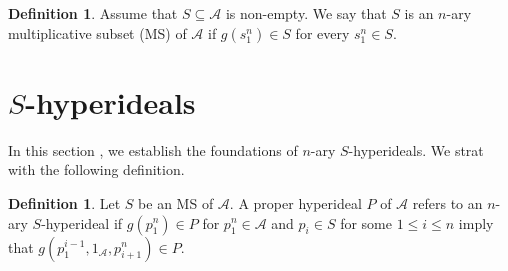 \documentclass[preprint,review,10pt]{amsart}
\theoremstyle{definition}
\newtheorem{definition}[theorem]{Definition}
\theoremstyle{remark}
\numberwithin{equation}{section}
\begin{document}
\begin{definition} \cite{sorc1}
Assume that $S \subseteq \mathscr{A}$ is  non-empty. We say that $S$ is  an  $n$-ary multiplicative subset (MS) of $\mathscr{A}$  if $g(s_1^n) \in S$ for every $s_1^n \in S$.
\end{definition}

\section{$S$-hyperideals}
In this section , we establish the foundations of $n$-ary $S$-hyperideals. We strat with the following definition.
\begin{definition}
Let $S$ be an MS of $\mathscr{A}$. A proper hyperideal $P$ of $\mathscr{A}$ refers to an $n$-ary $S$-hyperideal if  $g(p_1^n) \in P$ for   $p_1^n \in  \mathscr{A}$ and $p_i \in S$ for some $1 \leq i \leq n$ imply that $g(p_1^{i-1},1_\mathscr{A},p_{i+1}^n) \in P$. 
\end{definition}
\end{document}
